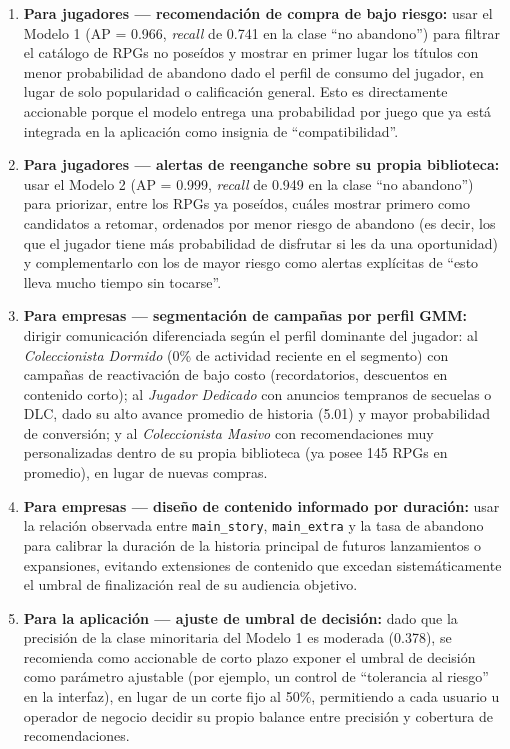 \documentclass[11pt,letterpaper]{article}
\newcommand{\code}[1]{\texttt{\small #1}}
\begin{document}
\begin{enumerate}
  \item \textbf{Para jugadores --- recomendación de compra de bajo riesgo:} usar el Modelo 1 (AP = 0.966, \textit{recall} de 0.741 en la clase ``no abandono'') para filtrar el catálogo de RPGs no poseídos y mostrar en primer lugar los títulos con menor probabilidad de abandono dado el perfil de consumo del jugador, en lugar de solo popularidad o calificación general. Esto es directamente accionable porque el modelo entrega una probabilidad por juego que ya está integrada en la aplicación como insignia de ``compatibilidad''.
  \item \textbf{Para jugadores --- alertas de reenganche sobre su propia biblioteca:} usar el Modelo 2 (AP = 0.999, \textit{recall} de 0.949 en la clase ``no abandono'') para priorizar, entre los RPGs ya poseídos, cuáles mostrar primero como candidatos a retomar, ordenados por menor riesgo de abandono (es decir, los que el jugador tiene más probabilidad de disfrutar si les da una oportunidad) y complementarlo con los de mayor riesgo como alertas explícitas de ``esto lleva mucho tiempo sin tocarse''.
  \item \textbf{Para empresas --- segmentación de campañas por perfil GMM:} dirigir comunicación diferenciada según el perfil dominante del jugador: al \emph{Coleccionista Dormido} (0\% de actividad reciente en el segmento) con campañas de reactivación de bajo costo (recordatorios, descuentos en contenido corto); al \emph{Jugador Dedicado} con anuncios tempranos de secuelas o DLC, dado su alto avance promedio de historia (5.01) y mayor probabilidad de conversión; y al \emph{Coleccionista Masivo} con recomendaciones muy personalizadas dentro de su propia biblioteca (ya posee 145 RPGs en promedio), en lugar de nuevas compras.
  \item \textbf{Para empresas --- diseño de contenido informado por duración:} usar la relación observada entre \code{main\_story}, \code{main\_extra} y la tasa de abandono para calibrar la duración de la historia principal de futuros lanzamientos o expansiones, evitando extensiones de contenido que excedan sistemáticamente el umbral de finalización real de su audiencia objetivo.
  \item \textbf{Para la aplicación --- ajuste de umbral de decisión:} dado que la precisión de la clase minoritaria del Modelo 1 es moderada (0.378), se recomienda como accionable de corto plazo exponer el umbral de decisión como parámetro ajustable (por ejemplo, un control de ``tolerancia al riesgo'' en la interfaz), en lugar de un corte fijo al 50\%, permitiendo a cada usuario u operador de negocio decidir su propio balance entre precisión y cobertura de recomendaciones.
\end{enumerate}
\end{document}
